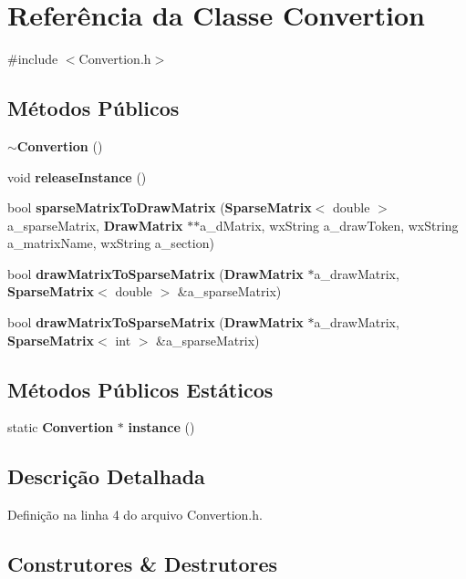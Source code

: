 \section{Referência da Classe Convertion}
\label{class_convertion}


{\ttfamily \#include $<$Convertion.\+h$>$}

\subsection*{Métodos Públicos}
\begin{DoxyCompactItemize}
\item 
{\bf $\sim$\+Convertion} ()
\item 
void {\bf release\+Instance} ()
\item 
bool {\bf sparse\+Matrix\+To\+Draw\+Matrix} ({\bf Sparse\+Matrix}$<$ double $>$ a\+\_\+sparse\+Matrix, {\bf Draw\+Matrix} $\ast$$\ast$a\+\_\+d\+Matrix, wx\+String a\+\_\+draw\+Token, wx\+String a\+\_\+matrix\+Name, wx\+String a\+\_\+section)
\item 
bool {\bf draw\+Matrix\+To\+Sparse\+Matrix} ({\bf Draw\+Matrix} $\ast$a\+\_\+draw\+Matrix, {\bf Sparse\+Matrix}$<$ double $>$ \&a\+\_\+sparse\+Matrix)
\item 
bool {\bf draw\+Matrix\+To\+Sparse\+Matrix} ({\bf Draw\+Matrix} $\ast$a\+\_\+draw\+Matrix, {\bf Sparse\+Matrix}$<$ int $>$ \&a\+\_\+sparse\+Matrix)
\end{DoxyCompactItemize}
\subsection*{Métodos Públicos Estáticos}
\begin{DoxyCompactItemize}
\item 
static {\bf Convertion} $\ast$ {\bf instance} ()
\end{DoxyCompactItemize}


\subsection{Descrição Detalhada}


Definição na linha 4 do arquivo Convertion.\+h.



\subsection{Construtores \& Destrutores}
